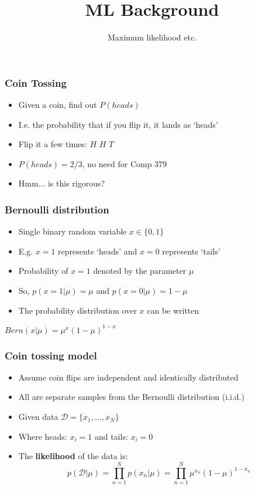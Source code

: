 \documentclass{beamer}
\title{ML Background}
\subtitle{Maximum likelihood etc.}
\begin{document}
\maketitle

\begin{frame}
  \frametitle{Coin Tossing}
  \begin{itemize}
  \item Given a coin, find out $P(heads)$
  \item I.e. the probability that if you flip it, it lands as `heads' \pause
  \item Flip it a few times: $H$ $H$ $T$
  \item $P(heads)=2/3$, no need for Comp 379
  \item Hmm... is this rigorous?
  \end{itemize}
\end{frame}

\begin{frame}
  \frametitle{Bernoulli distribution}
  \begin{itemize}
  \item Single binary random variable $x\in\{0,1\}$
  \item E.g. $x=1$ represents `heads' and $x=0$ represents `tails'
  \item Probability of $x=1$ denoted by the parameter $\mu$
  \item So, $p(x=1|\mu) = \mu$ and $p(x=0|\mu) = 1 - \mu$
  \item The probability distribution over $x$ can be written
  \end{itemize}
  \centering
  $Bern(x|\mu) = \mu^x(1-\mu)^{1-x}$
\end{frame}

\begin{frame}
  \frametitle{Coin tossing model}
  \begin{itemize}
  \item Assume coin flips are independent and identically distributed
  \item All are separate samples from the Bernoulli distribution (i.i.d.)
  \item Given data $\mathcal{D} = \{x_1,\ldots,x_N\}$
  \item Where heads: $x_i=1$ and tails: $x_i=0$
  \item The \textbf{likelihood} of the data is: \[p(\mathcal{D}|\mu) = \prod_{n=1}^{N} p(x_n|\mu) = \prod_{n=1}^{N} \mu^{x_n} (1-\mu)^{1-x_n} \]
  \end{itemize}
\end{frame}
\end{document}
